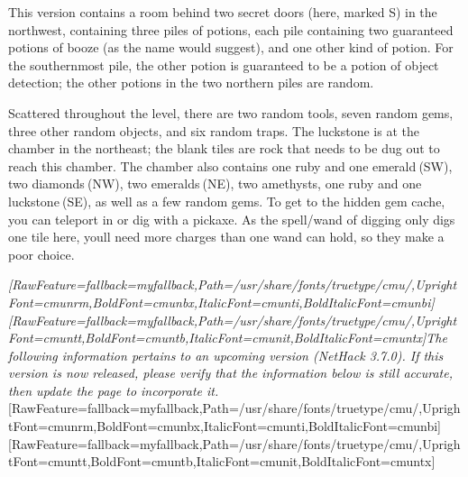 This version contains a room behind two secret doors (here, marked S) in the northwest, containing three piles of potions, each pile containing two guaranteed potions of booze (as the name would suggest), and one other kind of potion. For the southernmost pile, the other potion is guaranteed to be a potion of object detection; the other potions in the two northern piles are random.

Scattered throughout the level, there are two random tools, seven random gems, three other random objects, and six random traps. The luckstone is at the chamber in the northeast; the blank tiles are rock that needs to be dug out to reach this chamber. The chamber also contains one ruby and one emerald{\mbox{$~$}}(SW), two diamonds{\mbox{$~$}}(NW), two emeralds{\mbox{$~$}}(NE), two amethysts, one ruby and one luckstone{\mbox{$~$}}(SE), as well as a few random gems. To get to the hidden gem cache, you can teleport in or dig with a pickaxe. As the spell/wand of digging only digs one tile here, you\textquotesingle{}ll need more charges than one wand can hold, so they make a poor choice.

{\itshape \allowbreak{}\setmainfont{cmunti.ttf}[RawFeature={fallback=myfallback},Path=/usr/share/fonts/truetype/cmu/,UprightFont=cmunrm,BoldFont=cmunbx,ItalicFont=cmunti,BoldItalicFont=cmunbi]\setmonofont{cmunti.ttf}[RawFeature={fallback=myfallback},Path=/usr/share/fonts/truetype/cmu/,UprightFont=cmuntt,BoldFont=cmuntb,ItalicFont=cmunit,BoldItalicFont=cmuntx]\itshape The following information pertains to an upcoming version (NetHack 3.7.0\footnotemark[72]). If this version is now released, please verify that the information below is still accurate, then update the page to incorporate it.}\allowbreak{}\setmainfont{cmunrm.ttf}[RawFeature={fallback=myfallback},Path=/usr/share/fonts/truetype/cmu/,UprightFont=cmunrm,BoldFont=cmunbx,ItalicFont=cmunti,BoldItalicFont=cmunbi]\setmonofont{cmunrm.ttf}[RawFeature={fallback=myfallback},Path=/usr/share/fonts/truetype/cmu/,UprightFont=cmuntt,BoldFont=cmuntb,ItalicFont=cmunit,BoldItalicFont=cmuntx]

